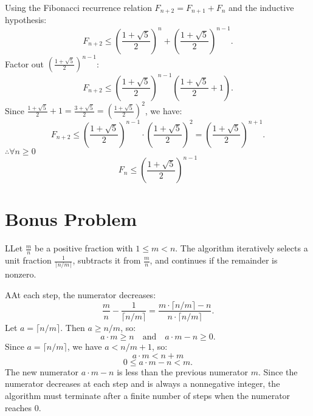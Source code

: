 \documentclass{report}
\begin{document}
\begin{inductstepWithTulip}
  Using the Fibonacci recurrence relation $F_{n+2} = F_{n+1} + F_{n}$ and the inductive hypothesis:
  \[ F_{n+2} \leq \left(\frac{1 + \sqrt{5}}{2}\right)^{n} + \left(\frac{1 + \sqrt{5}}{2}\right)^{n-1}. \]
  Factor out $\left(\frac{1 + \sqrt{5}}{2}\right)^{n-1}$:
  \[ F_{n+2} \leq \left(\frac{1 + \sqrt{5}}{2}\right)^{n-1} \left( \frac{1 + \sqrt{5}}{2} + 1 \right). \]
  Since $\frac{1 + \sqrt{5}}{2} + 1 = \frac{3 + \sqrt{5}}{2} = \left(\frac{1 + \sqrt{5}}{2}\right)^2$, we have:
  \[ F_{n+2} \leq \left(\frac{1 + \sqrt{5}}{2}\right)^{n-1} \cdot \left(\frac{1 + \sqrt{5}}{2}\right)^2 = \left(\frac{1 + \sqrt{5}}{2}\right)^{n+1}. \]
  $\therefore \forall n \geq 0$ 
  \[ F_{n} \leq \left(\frac{1 + \sqrt{5}}{2}\right)^{n-1} \]  
\end{inductstepWithTulip}

\section*{Bonus Problem}


  \begin{RemarkWithLily}{1}
    LLet $\frac{m}{n}$ be a positive fraction with $1 \leq m < n$. The algorithm iteratively selects a unit fraction 
    $\frac{1}{\lceil n/m \rceil}$, subtracts it from $\frac{m}{n}$, and continues if the remainder is nonzero. 
  \end{RemarkWithLily}

  \begin{RemarkWithLily}{2}
    AAt each step, the numerator decreases:
    \[ \frac{m}{n} - \frac{1}{\lceil n/m \rceil} = \frac{m \cdot \lceil n/m \rceil - n}{n \cdot \lceil n/m \rceil}. \]
    Let $a = \lceil n/m \rceil$. Then $a \geq n/m$, so:
    \[ a \cdot m \geq n \quad \text{and} \quad a \cdot m - n \geq 0. \]
    Since $a = \lceil n/m \rceil$, we have $a < n/m + 1$, so:
    \[ a \cdot m < n + m \]
    \[ 0 \leq a \cdot m - n < m. \]
    The new numerator $a \cdot m - n$ is  less than the previous numerator $m$. Since the numerator decreases at each step and is always a nonnegative integer, the algorithm must terminate after a finite number of steps when the numerator reaches $0$.
  \end{RemarkWithLily}
\end{document}
